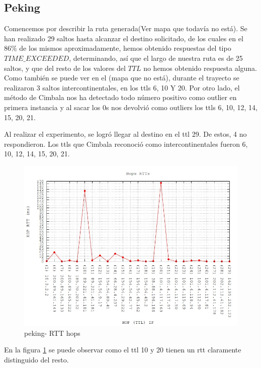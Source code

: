 \subsection{Peking}

Comencemos por describir la ruta generada(Ver mapa que todavía no está). Se han realizado 29 saltos hasta alcanzar el destino solicitado, de los cuales en el $86 \% $ de los mismos aproximadamente, hemos obtenido respuestas del tipo $TIME\_EXCEEDED$, determinando, así que el largo de nuestra ruta es de 25 saltos, y que del resto de los valores del $TTL$ no hemos obtenido respuesta alguna. Como también se puede ver en el (mapa que no está), durante el trayecto se realizaron 3 saltos intercontinentales, en los ttls 6, 10 Y 20. Por otro lado, el método de Cimbala nos ha detectado todo número positivo como outlier en primera instancia y al sacar los 0s nos devolvió como outliers los ttls 6, 10, 12, 14, 15, 20, 21.


Al realizar el experimento, se logró llegar al destino en el ttl 29. De estos, 4 no respondieron. Los ttls que Cimbala reconoció como intercontinentales fueron 6, 10, 12, 14, 15, 20, 21.

\begin{figure}[!htbp]
  \centering
    \includegraphics[scale=0.6]{imagenes/peking-graficos/traceroute-peking.jpg}
  \caption{peking- RTT hops}
  \label{fig:10}
\end{figure}

En la figura \ref{fig:10} se puede observar como el ttl 10 y 20 tienen un rtt claramente distinguido del resto.

